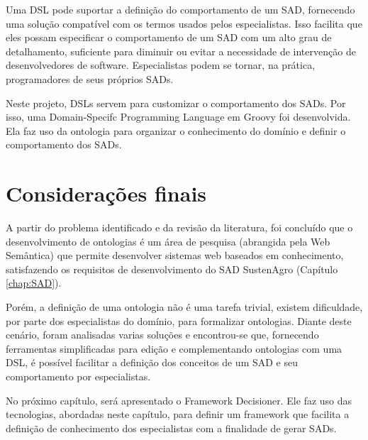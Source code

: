 Uma DSL pode suportar a definição do comportamento de um SAD, fornecendo
uma solução compatível com os termos usados pelos especialistas. Isso
facilita que eles possam especificar o comportamento de um SAD com
um alto grau de detalhamento, suficiente para diminuir ou evitar a
necessidade de intervenção de desenvolvedores de software. Especialistas
podem se tornar, na prática, programadores de seus próprios SADs.

Neste projeto, DSLs servem para customizar o comportamento dos SADs.
Por isso, uma \foreignlanguage{english}{Domain-Specifc Programming
Language }em Groovy foi desenvolvida. Ela faz uso da ontologia para
organizar o conhecimento do domínio e definir o comportamento dos
SADs. 

\section{Considerações finais}

A partir do problema identificado e da revisão da literatura, foi
concluído que o desenvolvimento de ontologias é um área de pesquisa
(abrangida pela Web Semântica) que permite desenvolver sistemas web
baseados em conhecimento, satisfazendo os requisitos de desenvolvimento
do SAD SustenAgro (Capítulo \ref{chap:SAD}).

Porém, a definição de uma ontologia não é uma tarefa trivial, existem
dificuldade, por parte dos especialistas do domínio, para formalizar
ontologias. Diante deste cenário, foram analisadas varias soluções
e encontrou-se que, fornecendo ferramentas simplificadas para edição
e complementando ontologias com uma DSL, é possível facilitar a definição
dos conceitos de um SAD e seu comportamento por especialistas.

No próximo capítulo, será apresentado o Framework Decisioner. Ele
faz uso das tecnologias, abordadas neste capítulo, para definir um
framework que facilita a definição de conhecimento dos especialistas
com a finalidade de gerar SADs.
